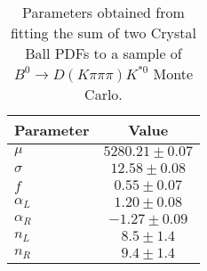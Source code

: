 \begin{table}[h]
  \centering
  \begin{tabular}{lc}
      \toprule
      Parameter & Value \\
      \midrule
      $\mu$ & $5280.21 \pm 0.07$ \\
      $\sigma$ & $12.58 \pm 0.08$ \\
      $f$ & $0.55 \pm 0.07$ \\
      $\alpha_L$ & $1.20 \pm 0.08$ \\
      $\alpha_R$ & $-1.27 \pm 0.09$ \\
      $n_L$ & $8.5 \pm 1.4$ \\
      $n_R$ & $9.4 \pm 1.4$ \\
  \bottomrule
  \end{tabular}
  \caption{Parameters obtained from fitting the sum of two Crystal Ball PDFs to a sample of $B^0 \to D(K\pi\pi\pi)K^{*0}$ Monte Carlo.}
\label{tab:signal_Kpipipi_MC_params}
\end{table}
